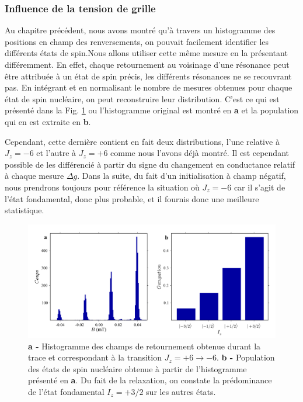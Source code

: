 \subsubsection{Influence de la tension de grille}
Au chapitre précédent, nous avons montré qu'à travers un histogramme des positions en champ des renversements, on pouvait facilement identifier les différents états de spin.Nous allons utiliser cette m\^eme mesure en la présentant différemment. En effet, chaque retournement au voisinage d'une résonance peut \^etre attribuée à un état de spin précis, les différents résonances ne se recouvrant pas. En intégrant et en normalisant le nombre de mesures obtenues pour chaque état de spin nucléaire, on peut reconstruire leur distribution. C'est ce qui est présenté dans la Fig. \ref{extract_pop} ou l'histogramme original est montré en \textbf{a} et la population qui en est extraite en \textbf{b}.

Cependant, cette dernière contient en fait deux distributions, l'une relative à $J_z=-6$ et l'autre à $J_z=+6$ comme nous l'avons déjà montré. Il est cependant possible de les différencié à partir du signe du changement en conductance relatif à chaque mesure $\Delta g$. Dans la suite, du fait d'un initialisation à champ négatif, nous prendrons toujours pour référence la situation où $J_z=-6$ car il s'agit de l'état fondamental, donc plus probable, et il fournis donc une meilleure statistique.

\begin{figure}
\includegraphics[scale=0.45]{Resultats/PopState/PopState.pdf} 
\caption{\textbf{a -} Histogramme des champs de retournement obtenue durant la trace et correspondant à la transition $J_z = +6 \rightarrow -6$. \textbf{b -} Population des états de spin nucléaire obtenue à partir de l'histogramme présenté en \textbf{a}. Du fait de la relaxation, on constate la prédominance de l'état fondamental $I_z=+3/2$ sur les autres états.}
\label{extract_pop}
\end{figure}

